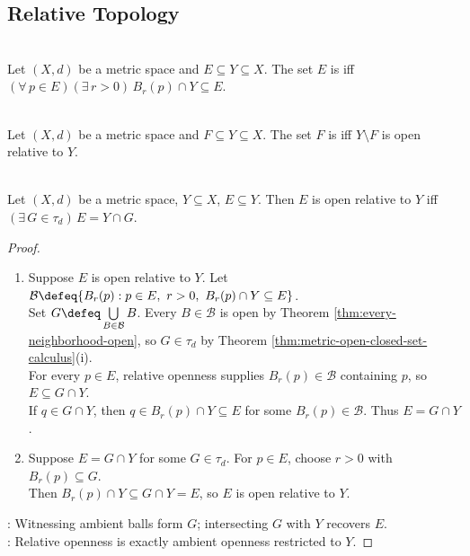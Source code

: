 \subsection{Relative Topology}

\begin{definition} \label{def:relative-open-subset} \\
Let $(X,d)$ be a metric space and $E\subseteq Y\subseteq X$. The set $E$ is  iff $(\forall\,p\in E)(\exists\,r>0)\,B_r(p)\cap Y\subseteq E$.
\end{definition}

\begin{definition} \label{def:relative-closed-subset} \\
Let $(X,d)$ be a metric space and $F\subseteq Y\subseteq X$. The set $F$ is  iff $Y\setminus F$ is open relative to $Y$.
\end{definition}

\begin{theorem} \label{thm:relative-open-intersection-with-open-set} \\
Let $(X,d)$ be a metric space, $Y\subseteq X$, $E\subseteq Y$. Then $E$ is open relative to $Y$ iff $(\exists\,G\in\tau_d)\,E=Y\cap G$.
\begin{proof}
\begin{enumerate}[label=\roman*.]
\setlength{\itemsep}{0pt}
\item[$(\Rightarrow)$] Suppose $E$ is open relative to $Y$. Let $\mathcal{B}\defeq\{B_r(p):p\in E,\ r>0,\ B_r(p)\cap Y\subseteq E\}$.\\
Set $G\defeq\bigcup\limits_{B\in\mathcal{B}}B$. Every $B\in\mathcal{B}$ is open by Theorem \ref{thm:every-neighborhood-open}, so $G\in\tau_d$ by Theorem \ref{thm:metric-open-closed-set-calculus}(i).\\
For every $p\in E$, relative openness supplies $B_r(p)\in\mathcal{B}$ containing $p$, so $E\subseteq G\cap Y$.\\
If $q\in G\cap Y$, then $q\in B_r(p)\cap Y\subseteq E$ for some $B_r(p)\in\mathcal{B}$. Thus $E=G\cap Y$.
\item[$(\Leftarrow)$] Suppose $E=G\cap Y$ for some $G\in\tau_d$. For $p\in E$, choose $r>0$ with $B_r(p)\subseteq G$.\\
Then $B_r(p)\cap Y\subseteq G\cap Y=E$, so $E$ is open relative to $Y$.
\end{enumerate}
: Witnessing ambient balls form $G$; intersecting $G$ with $Y$ recovers $E$.\\
: Relative openness is exactly ambient openness restricted to $Y$.
\end{proof}
\end{theorem}

